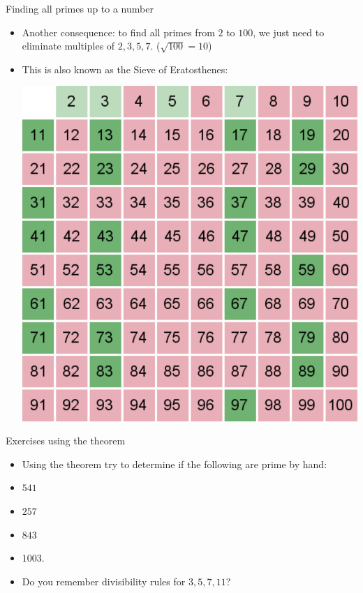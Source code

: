 \documentclass[ %
 usenames,dvipsnames,
aspectratio=169,11pt ]{beamer}
\newenvironment{stepitemize}{\begin{itemize}[<+->]}{\end{itemize} }
\begin{document}
\begin{frame}{Finding all primes up to a number}
\begin{stepitemize}
\item Another consequence: to find all primes from $2$ to $100$, we just need to eliminate multiples of $2,3,5,7$. ($\sqrt{100}=10$)
\item This is also known as the Sieve of Eratosthenes:

\bigskip

\begin{center}
    \includegraphics[scale=.40]{Erat.pdf}
\end{center}

\end{stepitemize}
\end{frame}

\begin{frame}{Exercises using the theorem}
\begin{stepitemize}
\item Using the theorem try to determine if the following are prime by hand:
\item $541$
\item $257$
\item $843$
\item $1003$.
\item Do you remember divisibility rules for $3,5,7,11$?
\end{stepitemize}

\end{frame}
\end{document}
